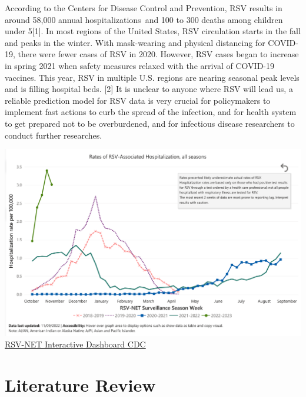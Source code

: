 \documentclass[
  letterpaper,
  DIV=11,
  numbers=noendperiod]{scrreport}
\begin{document}
According to the Centers for Disease Control and Prevention, RSV results
in around 58,000 annual hospitalizations~and 100 to 300 deaths among
children under 5{[}1{]}. In most regions of the United States, RSV
circulation starts in the fall and peaks in the winter. With
mask-wearing and physical distancing for COVID-19, there were fewer
cases of RSV in 2020. However, RSV cases began to increase in spring
2021 when safety measures relaxed with the arrival of COVID-19 vaccines.
This year, RSV in multiple U.S. regions are nearing seasonal peak levels
and is filling hospital beds. {[}2{]} It is unclear to anyone where RSV
will lead us, a reliable prediction model for RSV data is very crucial
for policymakers to implement fast actions to curb the spread of the
infection, and for health system to get prepared not to be overburdened,
and for infectious disease researchers to conduct further researches.

\includegraphics{./images/paste-84838FB2.png}\\

\href{https://www.cdc.gov/rsv/research/rsv-net/dashboard.html}{RSV-NET
Interactive Dashboard \textbar{} CDC}

\hypertarget{literature-review}{%
\section{Literature Review}\label{literature-review}}
\end{document}

